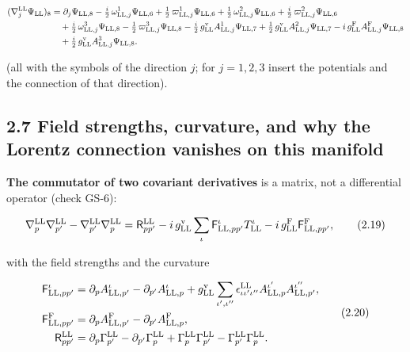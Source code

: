 \documentclass[
  10pt,
]{article}
\begin{document}
\[\begin{aligned}
(\nabla^{\rm LL}_j\Psi_{\rm LL})_8&=\partial_j\Psi_{{\rm LL},8}-\tfrac{i}{2}\,\omega^{1}_{{\rm LL},j}\Psi_{{\rm LL},6}+\tfrac{1}{2}\,\varpi^{1}_{{\rm LL},j}\Psi_{{\rm LL},6}+\tfrac{1}{2}\,\omega^{2}_{{\rm LL},j}\Psi_{{\rm LL},6}+\tfrac{i}{2}\,\varpi^{2}_{{\rm LL},j}\Psi_{{\rm LL},6}\\
&\quad +\tfrac{i}{2}\,\omega^{3}_{{\rm LL},j}\Psi_{{\rm LL},8}-\tfrac{1}{2}\,\varpi^{3}_{{\rm LL},j}\Psi_{{\rm LL},8}-\tfrac{i}{2}\,g^{\rm v}_{\rm LL}A^{1}_{{\rm LL},j}\Psi_{{\rm LL},7}+\tfrac{1}{2}\,g^{\rm v}_{\rm LL}A^{2}_{{\rm LL},j}\Psi_{{\rm LL},7}-i\,g^{\rm F}_{\rm LL}A^{\rm F}_{{\rm LL},j}\Psi_{{\rm LL},8}\\
&\quad +\tfrac{i}{2}\,g^{\rm v}_{\rm LL}A^{3}_{{\rm LL},j}\Psi_{{\rm LL},8}.
\end{aligned}\]

(all with the symbols of the direction \(j\); for \(j=1,2,3\) insert the
potentials and the connection of that direction).

\hypertarget{field-strengths-curvature-and-why-the-lorentz-connection-vanishes-on-this-manifold}{%
\subsection{2.7 Field strengths, curvature, and why the Lorentz
connection vanishes on this
manifold}\label{field-strengths-curvature-and-why-the-lorentz-connection-vanishes-on-this-manifold}}

\textbf{The commutator of two covariant derivatives} is a matrix, not a
differential operator (check GS-6):

\[\nabla^{\rm LL}_p\nabla^{\rm LL}_{p'}-\nabla^{\rm LL}_{p'}\nabla^{\rm LL}_p=\mathsf R^{\rm LL}_{pp'}-i\,g^{\rm v}_{\rm LL}\sum_\iota\mathsf F^\iota_{{\rm LL},pp'}T^\iota_{\rm LL}-i\,g^{\rm F}_{\rm LL}\mathsf F^{\rm F}_{{\rm LL},pp'},\tag{2.19}\]

with the field strengths and the curvature

\[\begin{aligned}
\mathsf F^\iota_{{\rm LL},pp'}&=\partial_pA^\iota_{{\rm LL},p'}-\partial_{p'}A^\iota_{{\rm LL},p}+g^{\rm v}_{\rm LL}\sum_{\iota',\iota''}\epsilon^{\rm LL}_{\iota\iota'\iota''}A^{\iota'}_{{\rm LL},p}A^{\iota''}_{{\rm LL},p'},\\
\mathsf F^{\rm F}_{{\rm LL},pp'}&=\partial_pA^{\rm F}_{{\rm LL},p'}-\partial_{p'}A^{\rm F}_{{\rm LL},p},\\
\mathsf R^{\rm LL}_{pp'}&=\partial_p\Gamma^{\rm LL}_{p'}-\partial_{p'}\Gamma^{\rm LL}_p+\Gamma^{\rm LL}_p\Gamma^{\rm LL}_{p'}-\Gamma^{\rm LL}_{p'}\Gamma^{\rm LL}_p.
\end{aligned}\tag{2.20}\]
\end{document}
